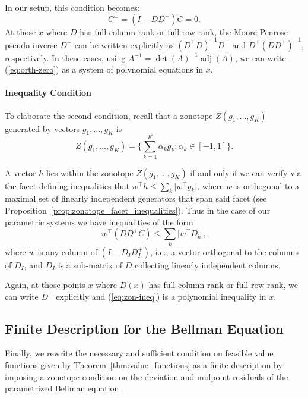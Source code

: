 \documentclass{article}
\theoremstyle{definition}
\theoremstyle{remark}
\begin{document}
In our setup, this condition becomes: 
\begin{equation} 
C^{\perp} = (I-DD^+)C = 0 . 
\label{eq:orth-zero}
\end{equation} 
%
At those $x$ where $D$ has full column rank or full row rank, the Moore-Penrose pseudo inverse $D^+$ can be written explicitly as $(D^\top D)^{-1}D^\top$ and $D^\top(DD^\top)^{-1}$, respectively. In these cases, using $A^{-1} = \det(A)^{-1}\operatorname{adj}(A)$, we can write (\ref{eq:orth-zero}) as a system of polynomial equations in $x$. 

\paragraph{Inequality Condition}
To elaborate the second condition, recall that a zonotope $Z(g_1,\dots, g_K)$ generated by vectors $g_1,\dots, g_K$ is 
$$
Z(g_1,\dots, g_K) = \Big\{\sum_{k=1}^K \alpha_kg_k : \alpha_k \in [-1, 1] \Big\}.
$$ 

A vector $h$ lies within the zonotope $Z(g_1,\dots,g_K)$ if and only if we can verify via the facet-defining inequalities that $w^\top h \leq \sum_k \vert w^\top g_k\vert $, where $w$ is orthogonal to a maximal set of linearly independent generators that span said facet (see Proposition~\ref{prop:zonotope_facet_inequalities}). 
%
Thus in the case of our parametric systems we have inequalities of the form 
\begin{equation} 
    w^\top (DD^+C) \leq \sum_k \vert w^\top D_k\vert , 
\label{eq:zon-ineq}
\end{equation} 
where $w$ is any column of $(I - D_ID_I^+)$, i.e., a vector orthogonal to the columns of $D_I$, and $D_I$ is a sub-matrix  of $D$ collecting linearly independent columns. 

Again, at those points $x$ where $D(x)$ has full column rank or full row rank, we can write $D^+$ explicitly and (\ref{eq:zon-ineq}) is a polynomial inequality in $x$. 

\subsection{Finite Description for the Bellman Equation} 

Finally, we rewrite the necessary and sufficient condition on feasible value functions given by Theorem~\ref{thm:value_functions} as a finite description by imposing a zonotope condition on the deviation and midpoint residuals of the parametrized Bellman equation.
\end{document}
